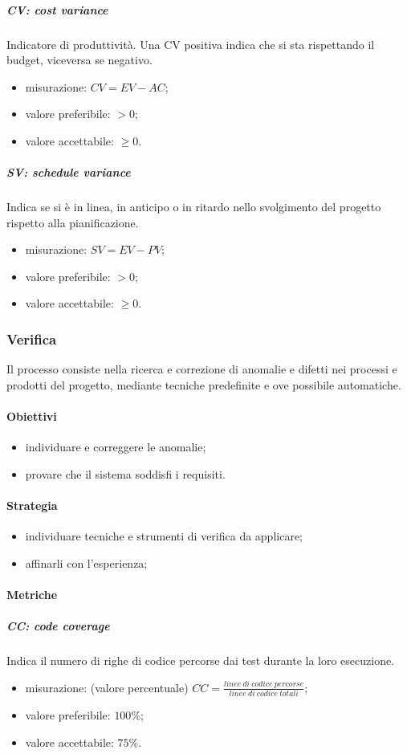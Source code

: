 		\subparagraph{CV: cost variance}
			Indicatore di produttività. Una CV positiva indica che si sta rispettando il budget, viceversa se negativo.
			\begin{itemize}
				\item misurazione: $CV = EV - AC$;
				\item valore preferibile: $ > 0$;
				\item valore accettabile: $ \geq 0$.
			\end{itemize}
		\subparagraph{SV: schedule variance}
			Indica se si è in linea, in anticipo o in ritardo nello svolgimento del progetto rispetto alla pianificazione.
			\begin{itemize}
				\item misurazione: $SV = EV - PV$;
				\item valore preferibile: $ > 0$;
				\item valore accettabile: $ \geq 0$. 
			\end{itemize}
			
	\subsubsection{Verifica}
	Il processo consiste nella ricerca e correzione di anomalie e difetti nei processi e prodotti del progetto, mediante tecniche predefinite e ove possibile automatiche.
		\paragraph{Obiettivi}
		\begin{itemize}
			\item individuare e correggere le anomalie;
			\item provare che il sistema soddisfi i requisiti.
		\end{itemize}	
		\paragraph{Strategia}
		\begin{itemize}
			\item individuare tecniche e strumenti di verifica da applicare;
			\item affinarli con l'esperienza;
		\end{itemize}	
		\paragraph{Metriche}
			\subparagraph{CC: code coverage}
				Indica il numero di righe di codice percorse dai test durante la loro esecuzione. 
				\begin{itemize}
					\item misurazione: (valore percentuale) $CC = \frac{linee\ di\ codice\ percorse}{linee\ di\ codice\ totali}$;
					\item valore preferibile: $100\%$;
					\item valore accettabile: $75\%$.
				\end{itemize}

